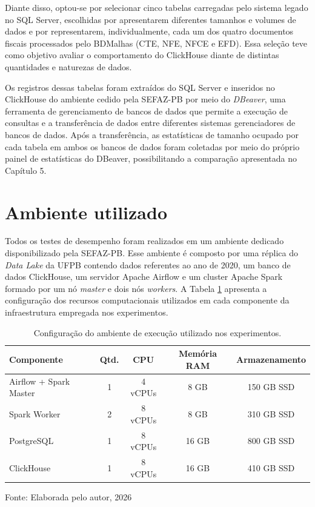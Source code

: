 Diante disso, optou-se por selecionar cinco tabelas carregadas pelo sistema legado no SQL Server,
escolhidas por apresentarem diferentes tamanhos e volumes de dados e por representarem,
individualmente, cada um dos quatro documentos fiscais processados pelo BDMalhas (CTE, NFE,
NFCE e EFD). Essa seleção teve como objetivo avaliar o comportamento do ClickHouse diante de
distintas quantidades e naturezas de dados.

Os registros dessas tabelas foram extraídos do SQL Server e inseridos no ClickHouse do ambiente
cedido pela SEFAZ-PB por meio do \textit{DBeaver}, uma ferramenta de gerenciamento de bancos de
dados que permite a execução de consultas e a transferência de dados entre diferentes sistemas
gerenciadores de bancos de dados. Após a transferência, as estatísticas de tamanho ocupado por
cada tabela em ambos os bancos de dados foram coletadas por meio do próprio painel de estatísticas
do DBeaver, possibilitando a comparação apresentada no Capítulo 5.

\section{Ambiente utilizado}

Todos os testes de desempenho foram realizados em um ambiente dedicado disponibilizado pela 
SEFAZ-PB. Esse ambiente é composto por uma réplica do \textit{Data Lake} da UFPB contendo dados 
referentes ao ano de 2020, um banco de dados ClickHouse, um servidor Apache Airflow e um 
cluster Apache Spark formado por um nó \textit{master} e dois nós \textit{workers}. A Tabela \ref{tab:ambiente_execucao} 
apresenta a configuração dos recursos computacionais utilizados em cada componente da 
infraestrutura empregada nos experimentos.


\begin{table}[htb]
\centering
\caption{Configuração do ambiente de execução utilizado nos experimentos.}
\label{tab:ambiente_execucao}

\renewcommand{\arraystretch}{1.2}

\begin{tabular}{|p{4.8cm}|c|c|c|c|}
\hline
\textbf{Componente} & \textbf{Qtd.} & \textbf{CPU} & \textbf{Memória RAM} & \textbf{Armazenamento} \\
\hline
Airflow + Spark Master & 1 & 4 vCPUs & 8 GB & 150 GB SSD \\
\hline
Spark Worker & 2 & 8 vCPUs & 8 GB & 310 GB SSD \\
\hline
PostgreSQL & 1 & 8 vCPUs & 16 GB & 800 GB SSD \\
\hline
ClickHouse & 1 & 8 vCPUs & 16 GB & 410 GB SSD \\
\hline
\end{tabular}

\vspace{0.6em}
{\small Fonte: Elaborada pelo autor, 2026}

\end{table}
